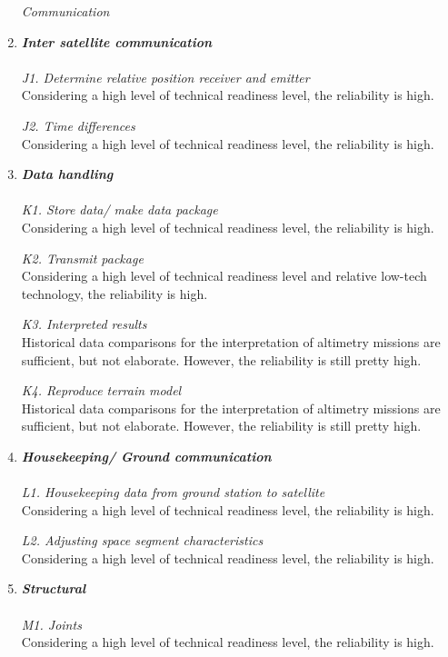 \begin{enumerate}[A]
\begin{description}
\item[\textit{Communication}]
\end{description}
	\item\textbf{\textit{Inter satellite communication}} \\\\
\textit{J1. Determine relative position receiver and emitter}\\ 
Considering a high level of technical readiness level, the reliability is high.

\textit{J2. Time differences}\\ 
Considering a high level of technical readiness level, the reliability is high.

	\item\textbf{\textit{Data handling}} \\\\
\textit{K1. Store data/ make data package}\\ 
Considering a high level of technical readiness level, the reliability is high.

\textit{K2. Transmit package}\\ 
Considering a high level of technical readiness level and relative low-tech technology, the reliability is high.

\textit{K3. Interpreted results}\\ 
Historical data comparisons for the interpretation of altimetry missions are sufficient, but not elaborate. However, the reliability is still pretty high.

\textit{K4. Reproduce terrain model}\\
Historical data comparisons for the interpretation of altimetry missions are sufficient, but not elaborate. However, the reliability is still pretty high.
 
	\item\textbf{\textit{Housekeeping/ Ground communication}} \\\\
\textit{L1. Housekeeping data from ground station to satellite}\\ 
Considering a high level of technical readiness level, the reliability is high.

\textit{L2. Adjusting space segment characteristics}\\ 
Considering a high level of technical readiness level, the reliability is high.

	\item\textbf{\textit{Structural}} \\\\
\textit{M1. Joints}\\ 
Considering a high level of technical readiness level, the reliability is high.


\end{enumerate}
